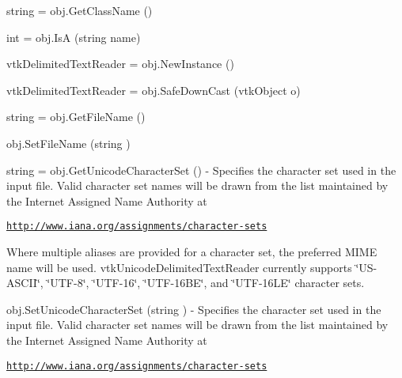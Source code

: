 \begin{DoxyItemize}
\item {\ttfamily string = obj.\-Get\-Class\-Name ()}  
\item {\ttfamily int = obj.\-Is\-A (string name)}  
\item {\ttfamily vtk\-Delimited\-Text\-Reader = obj.\-New\-Instance ()}  
\item {\ttfamily vtk\-Delimited\-Text\-Reader = obj.\-Safe\-Down\-Cast (vtk\-Object o)}  
\item {\ttfamily string = obj.\-Get\-File\-Name ()}  
\item {\ttfamily obj.\-Set\-File\-Name (string )}  
\item {\ttfamily string = obj.\-Get\-Unicode\-Character\-Set ()} -\/ Specifies the character set used in the input file. Valid character set names will be drawn from the list maintained by the Internet Assigned Name Authority at

\href{http://www.iana.org/assignments/character-sets}{\tt http\-://www.\-iana.\-org/assignments/character-\/sets}

Where multiple aliases are provided for a character set, the preferred M\-I\-M\-E name will be used. vtk\-Unicode\-Delimited\-Text\-Reader currently supports \char`\"{}\-U\-S-\/\-A\-S\-C\-I\-I\char`\"{}, \char`\"{}\-U\-T\-F-\/8\char`\"{}, \char`\"{}\-U\-T\-F-\/16\char`\"{}, \char`\"{}\-U\-T\-F-\/16\-B\-E\char`\"{}, and \char`\"{}\-U\-T\-F-\/16\-L\-E\char`\"{} character sets.  
\item {\ttfamily obj.\-Set\-Unicode\-Character\-Set (string )} -\/ Specifies the character set used in the input file. Valid character set names will be drawn from the list maintained by the Internet Assigned Name Authority at

\href{http://www.iana.org/assignments/character-sets}{\tt http\-://www.\-iana.\-org/assignments/character-\/sets}


\end{DoxyItemize}
